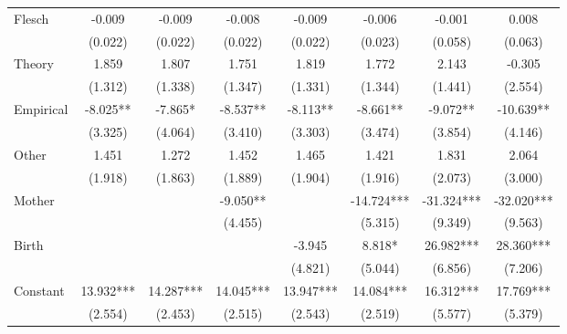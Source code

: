 \begin{table}
\begin{adjustwidth}{-0.085cm}{}
\begin{threeparttable}
\begin{tabular}{p{2.64cm}SSSSSSS}
            Flesch                        &      -0.009   &      -0.009   &      -0.008   &      -0.009   &      -0.006   &      -0.001   &       0.008   \\
                                          &     (0.022)   &     (0.022)   &     (0.022)   &     (0.022)   &     (0.023)   &     (0.058)   &     (0.063)   \\
            Theory                        &       1.859   &       1.807   &       1.751   &       1.819   &       1.772   &       2.143   &      -0.305   \\
                                          &     (1.312)   &     (1.338)   &     (1.347)   &     (1.331)   &     (1.344)   &     (1.441)   &     (2.554)   \\
            Empirical                     &      -8.025** &      -7.865*  &      -8.537** &      -8.113** &      -8.661** &      -9.072** &     -10.639** \\
                                          &     (3.325)   &     (4.064)   &     (3.410)   &     (3.303)   &     (3.474)   &     (3.854)   &     (4.146)   \\
            Other                         &       1.451   &       1.272   &       1.452   &       1.465   &       1.421   &       1.831   &       2.064   \\
                                          &     (1.918)   &     (1.863)   &     (1.889)   &     (1.904)   &     (1.916)   &     (2.073)   &     (3.000)   \\
            Mother                        &               &               &      -9.050** &               &     -14.724***&     -31.324***&     -32.020***\\
                                          &               &               &     (4.455)   &               &     (5.315)   &     (9.349)   &     (9.563)   \\
            Birth                         &               &               &               &      -3.945   &       8.818*  &      26.982***&      28.360***\\
                                          &               &               &               &     (4.821)   &     (5.044)   &     (6.856)   &     (7.206)   \\
            Constant                      &      13.932***&      14.287***&      14.045***&      13.947***&      14.084***&      16.312***&      17.769***\\
                                          &     (2.554)   &     (2.453)   &     (2.515)   &     (2.543)   &     (2.519)   &     (5.577)   &     (5.379)   \\

\end{tabular}
\end{threeparttable}
\end{adjustwidth}
\end{table}
